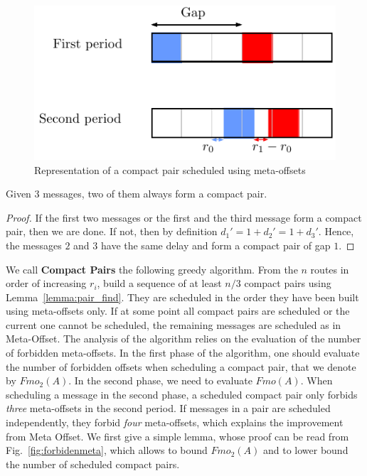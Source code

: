 \documentclass[a4paper,UKenglish,cleveref, autoref, thm-restate]{lipics-v2019}
\begin{document}
\begin{figure}[h]
\begin{center}

\includegraphics[scale=0.7]{compact_pair}
\end{center}
\caption{Representation of a compact pair scheduled using meta-offsets}
\label{fig:compactpair}
\end{figure}

\begin{lemma}\label{lemma:pair_find}
Given $3$ messages, two of them always form a compact pair. 
\end{lemma}
\begin{proof}
If the first two messages or the first and the third message form a compact pair,
then we are done. If not, then by definition $d_{1}' = 1 + d_{2}' = 1 + d_{3}'$. Hence, the messages $2$ and $3$ have the same delay and form a compact pair of gap $1$.
\end{proof}

We call \textbf{Compact Pairs} the following greedy algorithm. From the $n$ routes in order
of increasing $r_i$, build a sequence of at least $n/3$ compact pairs using Lemma~\ref{lemma:pair_find}. They are scheduled in the order they have been built using meta-offsets only. If at some point all compact pairs are scheduled or the current one cannot be scheduled, the remaining messages are scheduled as in Meta-Offset. The analysis of the algorithm relies on the evaluation of the number of forbidden meta-offsets. In the first phase of the algorithm, one should evaluate the number of forbidden offsets when scheduling a compact pair, that we denote by $Fmo_2(A)$. In the second phase, we need to evaluate $Fmo(A)$. When scheduling a message in the second phase, a scheduled compact pair only forbids \emph{three} meta-offsets in the second period. If messages in a pair are scheduled independently, they forbid \emph{four} meta-offsets, which explains the improvement from Meta Offset. We first give a simple lemma, whose proof can be read from Fig.~\ref{fig:forbidenmeta}, which allows to bound $Fmo_2(A)$ and to lower bound the number of scheduled compact pairs.
\end{document}
